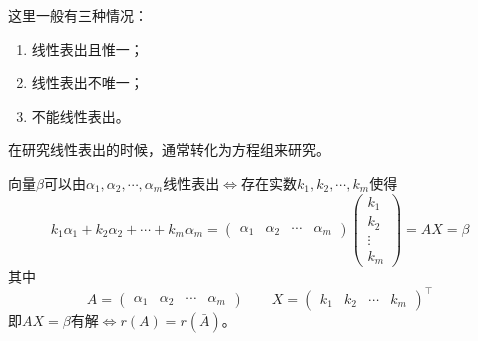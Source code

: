 这里一般有三种情况：
\begin{enumerate}[(1)]
    \item 线性表出且惟一；
    \item 线性表出不唯一；
    \item 不能线性表出。
\end{enumerate}
在研究线性表出的时候，通常转化为方程组来研究。
\begin{theorem}
    向量$\beta$可以由$\alpha_1,\alpha_2,\cdots,\alpha_m$线性表出$\iff$存在实数$k_1,k_2,\cdots,k_m$使得
    \[
        k_1\alpha_1 + k_2\alpha_2 +\cdots + k_m\alpha_m =
        \begin{pmatrix}
            \alpha_1 & \alpha_2 & \cdots & \alpha_m
        \end{pmatrix}
        \begin{pmatrix}
            k_1 \\k_2\\\vdots\\k_m
        \end{pmatrix}
        =AX=
        \beta
    \]
    其中
    \[
        A =
        \begin{pmatrix}
            \alpha_1 & \alpha_2 & \cdots & \alpha_m
        \end{pmatrix}
        \qquad
        X =
        \begin{pmatrix}
            k_1 & k_2 & \cdots & k_m
        \end{pmatrix}^\intercal
    \]
    即$AX=\beta$有解$\iff r(A)=r(\bar{A})$。
\end{theorem}

